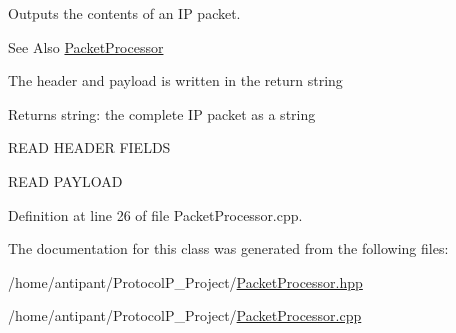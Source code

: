 Outputs the contents of an I\-P packet. 

\begin{DoxySeeAlso}{See Also}
\hyperlink{classPacketProcessor}{Packet\-Processor}
\end{DoxySeeAlso}
The header and payload is written in the return string \begin{DoxyReturn}{Returns}
string\-: the complete I\-P packet as a string 
\end{DoxyReturn}
R\-E\-A\-D H\-E\-A\-D\-E\-R F\-I\-E\-L\-D\-S

R\-E\-A\-D P\-A\-Y\-L\-O\-A\-D 

Definition at line 26 of file Packet\-Processor.\-cpp.



The documentation for this class was generated from the following files\-:\begin{DoxyCompactItemize}
\item 
/home/antipant/\-Protocol\-P\-\_\-\-Project/\hyperlink{PacketProcessor_8hpp}{Packet\-Processor.\-hpp}\item 
/home/antipant/\-Protocol\-P\-\_\-\-Project/\hyperlink{PacketProcessor_8cpp}{Packet\-Processor.\-cpp}\end{DoxyCompactItemize}
